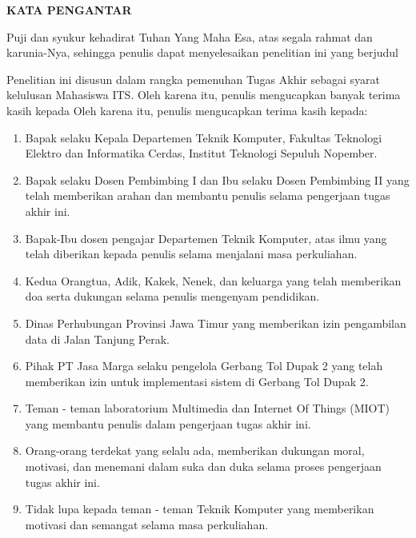 \begin{center}
  \Large
  \textbf{KATA PENGANTAR}
\end{center}


\vspace{2ex}


Puji dan syukur kehadirat Tuhan Yang Maha Esa, atas segala rahmat dan karunia-Nya, sehingga penulis dapat menyelesaikan penelitian ini yang berjudul \tatitle

Penelitian ini disusun dalam rangka pemenuhan Tugas Akhir sebagai syarat kelulusan Mahasiswa ITS. Oleh karena itu, penulis mengucapkan banyak terima kasih kepada Oleh karena itu, penulis mengucapkan terima kasih kepada:

\begin{enumerate}[nolistsep]
  \item Bapak \headofdepartment selaku Kepala Departemen Teknik Komputer, Fakultas Teknologi Elektro dan Informatika Cerdas, Institut Teknologi Sepuluh Nopember.
  \item Bapak \advisor selaku Dosen Pembimbing I dan Ibu \coadvisor selaku Dosen Pembimbing II yang telah memberikan arahan dan membantu penulis selama pengerjaan tugas akhir ini.
  \item Bapak-Ibu dosen pengajar Departemen Teknik Komputer, atas ilmu yang telah diberikan kepada penulis selama menjalani masa perkuliahan.
  \item Kedua Orangtua, Adik, Kakek, Nenek, dan keluarga yang telah memberikan doa serta dukungan selama penulis mengenyam pendidikan.
  \item Dinas Perhubungan Provinsi Jawa Timur yang memberikan izin pengambilan data di Jalan Tanjung Perak.
  \item Pihak PT Jasa Marga selaku pengelola Gerbang Tol Dupak 2 yang telah memberikan izin untuk implementasi sistem di Gerbang Tol Dupak 2.
  \item Teman - teman laboratorium Multimedia dan Internet Of Things (MIOT) yang membantu penulis dalam pengerjaan tugas akhir ini.
  \item Orang-orang terdekat yang selalu ada, memberikan dukungan moral, motivasi, dan menemani dalam suka dan duka selama proses pengerjaan tugas akhir ini.
  \item Tidak lupa kepada teman - teman Teknik Komputer yang memberikan motivasi dan semangat selama masa perkuliahan.
\end{enumerate}

